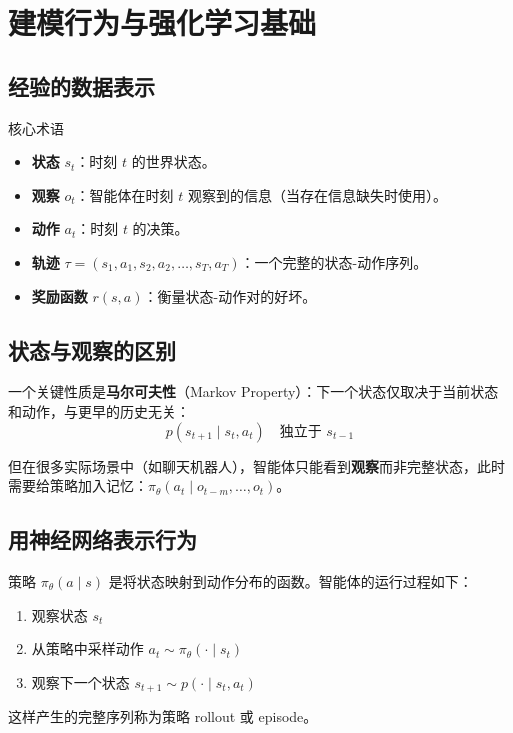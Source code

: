 \section{建模行为与强化学习基础}

\subsection{经验的数据表示}

\begin{importantbox}{核心术语}
\begin{itemize}
    \item \textbf{状态} $s_t$：时刻 $t$ 的世界状态。
    \item \textbf{观察} $o_t$：智能体在时刻 $t$ 观察到的信息（当存在信息缺失时使用）。
    \item \textbf{动作} $a_t$：时刻 $t$ 的决策。
    \item \textbf{轨迹} $\tau = (s_1, a_1, s_2, a_2, \ldots, s_T, a_T)$：一个完整的状态-动作序列。
    \item \textbf{奖励函数} $r(s, a)$：衡量状态-动作对的好坏。
\end{itemize}
\end{importantbox}

\subsection{状态与观察的区别}

一个关键性质是\textbf{马尔可夫性}（Markov Property）：下一个状态仅取决于当前状态和动作，与更早的历史无关：
$$p(s_{t+1} \mid s_t, a_t) \quad \text{独立于 } s_{t-1}$$

但在很多实际场景中（如聊天机器人），智能体只能看到\textbf{观察}而非完整状态，此时需要给策略加入记忆：$\pi_\theta(a_t \mid o_{t-m}, \ldots, o_t)$。

\subsection{用神经网络表示行为}

策略 $\pi_\theta(a \mid s)$ 是将状态映射到动作分布的函数。智能体的运行过程如下：
\begin{enumerate}
    \item 观察状态 $s_t$
    \item 从策略中采样动作 $a_t \sim \pi_\theta(\cdot \mid s_t)$
    \item 观察下一个状态 $s_{t+1} \sim p(\cdot \mid s_t, a_t)$
\end{enumerate}
这样产生的完整序列称为策略 rollout 或 episode。

